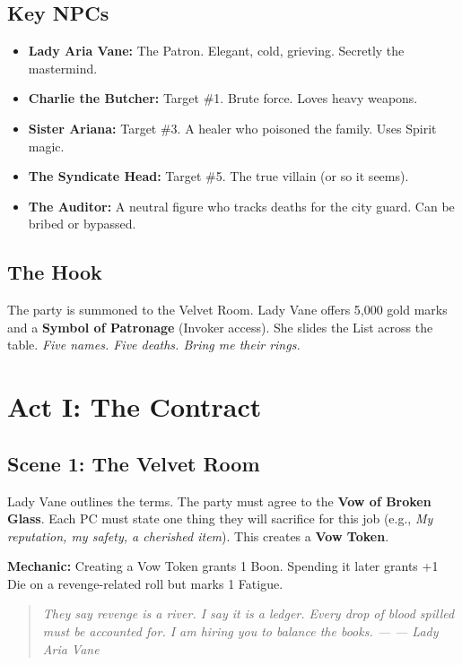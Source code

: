 \documentclass[12pt]{book}
\newcommand{\letter}[2]{%
    \begin{quote}\small\itshape #1 \hfill --- #2\end{quote}}
\begin{document}
\section{Key NPCs}

\begin{itemize}
    \item \textbf{Lady Aria Vane:} The Patron. Elegant, cold, grieving. Secretly the mastermind.
    \item \textbf{Charlie the Butcher:} Target \#1. Brute force. Loves heavy weapons.
    \item \textbf{Sister Ariana:} Target \#3. A healer who poisoned the family. Uses Spirit magic.
    \item \textbf{The Syndicate Head:} Target \#5. The true villain (or so it seems).
    \item \textbf{The Auditor:} A neutral figure who tracks deaths for the city guard. Can be bribed or bypassed.
\end{itemize}

\section{The Hook}

The party is summoned to the Velvet Room. Lady Vane offers 5,000 gold marks and a \textbf{Symbol of Patronage} (Invoker access). She slides the List across the table. \textit{Five names. Five deaths. Bring me their rings.}

\chapter{Act I: The Contract}

\section{Scene 1: The Velvet Room}

Lady Vane outlines the terms. The party must agree to the \textbf{Vow of Broken Glass}. Each PC must state one thing they will sacrifice for this job (e.g., \textit{My reputation, my safety, a cherished item}). This creates a \textbf{Vow Token}.

\textbf{Mechanic:} Creating a Vow Token grants 1 Boon. Spending it later grants +1 Die on a revenge-related roll but marks 1 Fatigue.

\letter{They say revenge is a river. I say it is a ledger. Every drop of blood spilled must be accounted for. I am hiring you to balance the books.}{--- Lady Aria Vane}
\end{document}
